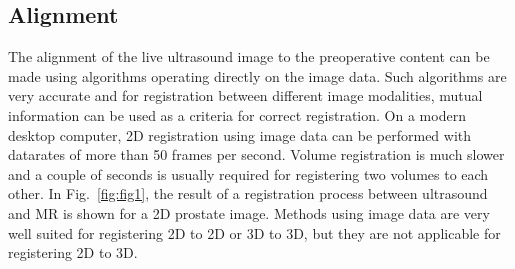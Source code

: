 \documentclass{article}[a4]
\begin{document}
\subsection{Alignment}
The alignment of the live ultrasound image to the preoperative content
can be made using algorithms operating directly on the image
data. Such algorithms are very accurate and for registration between different
image modalities, mutual information can be used as a criteria for
correct registration. On a modern desktop computer, 2D registration
using image data can be performed with datarates of more than 50
frames per second. Volume registration is much slower and a couple of
seconds is usually required for registering two volumes to each
other. In Fig.~\ref{fig:fig1}, the result of a registration process
between ultrasound and MR is shown for a 2D prostate image. Methods
using image data are very well suited for registering 2D to 2D or 3D
to 3D, but they are not applicable for registering 2D to 3D. 
\end{document}
